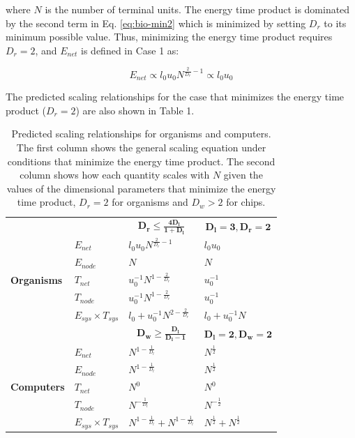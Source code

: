 \documentclass[12pt]{article}
\begin{document}
\noindent where $N$ is the number of terminal units.  The energy time product is dominated by the second term in Eq.
\ref{eq:bio-min2} which is minimized by setting $D_r$ to its minimum possible
value. Thus, minimizing the energy time product requires $D_r = 2$, and 
 $E_{net}$ is defined in Case 1 as: 

\begin{equation}
E_{net} \propto l_0 u_0 N^{\frac{2}{D_r}-1} \propto l_0 u_0
\label{eq:EnetOrg}
\end{equation}


\noindent The predicted scaling relationships for the case that minimizes the energy time product ($D_r = 2$) are also shown in Table 1.



\begin{table}
\centering
\begin{tabular}{l|l||l|l|}
\multicolumn{2}{l}{} & \multicolumn{1}{c}{$\mathbf{D_r \leq \frac{4D_l}{1+D_l}}$} & \multicolumn{1}{c}{$\mathbf{D_l=3, D_r=2}$}\\
  \cline{2-4}
\multirow{5}{*}{\textbf{Organisms}} & $E_{net}$ &$l_0u_0 N^{\frac{2}{D_r}-1}$ &  $l_0 u_0$\\
\cline{2-4}
& $E_{node}$ &  $N$ & $N$ \\
\cline{2-4}
& $T_{net}$ & $u_0^{-1}N^{1-\frac{2}{D_r}}$ & $u_0^{-1}$\\
\cline{2-4}
& $T_{node}$ & $u_0^{-1}N^{1-\frac{2}{D_r}}$ & $u_0^{-1}$ \\  

\cline{2-4}
& $E_{sys} \times T_{sys}$ & $l_0 + u_0^{-1}N^{2-\frac{2}{D_r}}$& $l_0 + u_0^{-1} N$\\
\cline{2-4}
\multicolumn{2}{c}{}  & \multicolumn{1}{c}{$\mathbf{D_w \geq \frac{D_l}{D_l-1}}$} & \multicolumn{1}{c}{$\mathbf{D_l=2,D_w =2}$} \\
\cline{2-4}

\multirow{5}{*}{\textbf{Computers}} & $E_{net}$ & $N^{1-\frac{1}{D_l}}$& $N^{\frac{1}{2}}$\\
\cline{2-4}
& $E_{node}$&$N^{1-\frac{1}{D_l}}$ &$N^{\frac{1}{2}}$ \\
\cline{2-4}
& $T_{net}$ & $N^{0}$& $N^{0}$\\
\cline{2-4}
& $T_{node}$& $N^{-\frac{1}{D_l}}$& $N^{-\frac{1}{2}}$\\
\cline{2-4}
& $E_{sys} \times T_{sys}$ &$N^{1-\frac{1}{D_l}} + N^{1-\frac{1}{D_l}}$ &$N^{\frac{1}{2}} + N^{\frac{1}{2}}$ \\
\cline{2-4}
\end{tabular}
\caption{Predicted scaling relationships for organisms and computers. The first column shows the general scaling equation under conditions that minimize the energy time product. The second column shows how each quantity scales with $N$ given the values of the dimensional parameters that minimize the energy time product, $D_r = 2$ for organisms and $D_w > 2$ for chips. 
\label{tab:SummaryScalingPredictions}}
\end{table}
\end{document}
